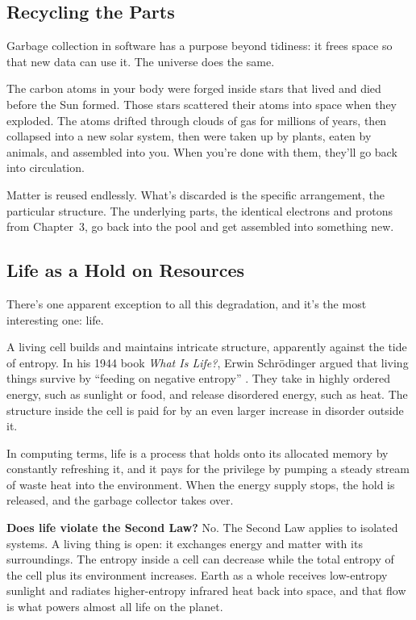 \subsection{Recycling the Parts}

Garbage collection in software has a purpose beyond tidiness: it frees space so that new data can use it. The universe does the same.

The carbon atoms in your body were forged inside stars that lived and died before the Sun formed. Those stars scattered their atoms into space when they exploded. The atoms drifted through clouds of gas for millions of years, then collapsed into a new solar system, then were taken up by plants, eaten by animals, and assembled into you. When you're done with them, they'll go back into circulation.

Matter is reused endlessly. What's discarded is the specific arrangement, the particular structure. The underlying parts, the identical electrons and protons from Chapter~3, go back into the pool and get assembled into something new.

\subsection{Life as a Hold on Resources}

There's one apparent exception to all this degradation, and it's the most interesting one: life.

A living cell builds and maintains intricate structure, apparently against the tide of entropy. In his 1944 book \emph{What Is Life?}, Erwin Schrödinger argued that living things survive by ``feeding on negative entropy'' \cite{schrodinger1944}. They take in highly ordered energy, such as sunlight or food, and release disordered energy, such as heat. The structure inside the cell is paid for by an even larger increase in disorder outside it.

In computing terms, life is a process that holds onto its allocated memory by constantly refreshing it, and it pays for the privilege by pumping a steady stream of waste heat into the environment. When the energy supply stops, the hold is released, and the garbage collector takes over.

\begin{commonquestionbox}
\textbf{Does life violate the Second Law?} No. The Second Law applies to isolated systems. A living thing is open: it exchanges energy and matter with its surroundings. The entropy inside a cell can decrease while the total entropy of the cell plus its environment increases. Earth as a whole receives low-entropy sunlight and radiates higher-entropy infrared heat back into space, and that flow is what powers almost all life on the planet.
\end{commonquestionbox}

